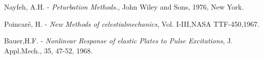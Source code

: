 \documentclass[12pt]{article}
\begin{document}
\begin{thebibliography}{00}
  {\sc Nayfeh,  A.H.} -
 {\it Peturbation Methods.}, John Wiley and Sons, 1976, New York.

  {\sc Poincaré, H.} -
{\it New Methods of celestialmechanics}, Vol. I-III,NASA TTF-450,1967.

  {\sc Bauer,H.F.} - {\it  Nonlinear Response of elastic Plates to Pulse Excitations}, J. Appl.Mech., 35, 47-52, 1968.
\end{thebibliography}

%
%
\end{document}
